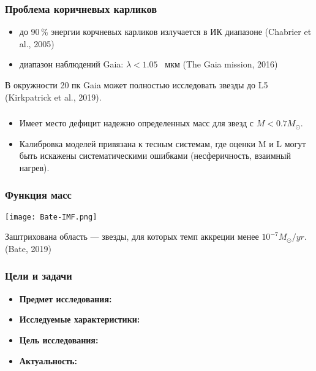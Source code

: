 \begin{frame}
\frametitle{Проблема коричневых карликов}
\begin{itemize}
  \item до 90\,\% энергии корчневых карликов излучается в ИК диапазоне (Chabrier et al., 2005)
  \item диапазон наблюдений Gaia: $\lambda <1.05$~ мкм (The Gaia mission, 2016)
\end{itemize}

В окружности 20 пк Gaia может полностью исследовать звезды до L5 (Kirkpatrick et al., 2019).
\end{frame}

\begin{frame}%
\frametitle{}
\begin{itemize}
\item Имеет место дефицит надежно определенных масс для звезд с $M<0.7 M_{\odot}$.
\item Калибровка моделей привязана к тесным системам, где оценки M и L могут быть искажены систематическими ошибками (несферичность, взаимный нагрев).
\end{itemize}
\end{frame}

\begin{frame}%
\frametitle{Функция масс}
\begin{center}
\texttt{[image: Bate-IMF.png]}
\end{center}
{\scriptsize Заштрихована область --- звезды, для которых темп аккреции менее $10^{-7}M_\odot/yr$. (Bate, 2019)}
\end{frame}



\begin{frame}
\frametitle{Цели и задачи}
\begin{itemize}
  \item \textbf{Предмет исследования:}
  \item \textbf{Исследуемые характеристики:}
  \item \textbf{Цель исследования:}
  \item \textbf{Актуальность:}
\end{itemize}
\end{frame}

